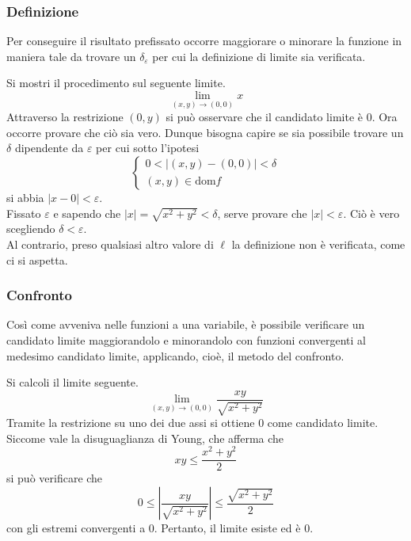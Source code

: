 \subsubsection{Definizione}
Per conseguire il risultato prefissato occorre maggiorare o minorare la funzione in maniera tale da trovare un $\delta_\varepsilon$ per cui la definizione di limite sia verificata.
\begin{example}
    Si mostri il procedimento sul seguente limite.
    \begin{equation*}
        \lim_{(x,y) \to (0,0)}x
    \end{equation*}
    Attraverso la restrizione $(0,y)$ si può osservare che il candidato limite è $0$. Ora occorre provare che ciò sia vero.
    Dunque bisogna capire se sia possibile trovare un $\delta$ dipendente da $\varepsilon$ per cui sotto l'ipotesi
    \begin{equation*}
        \begin{cases}
            0<|(x,y)-(0,0)|<\delta\\
            (x,y) \in \text{dom}f
        \end{cases}
    \end{equation*}
    si abbia $|x-0|<\varepsilon$.\\
    Fissato $\varepsilon$ e sapendo che $|x|=\sqrt{x^2+y^2}<\delta$, serve provare che $|x|<\varepsilon$. Ciò è vero scegliendo $\delta<\varepsilon$.\\
    Al contrario, preso qualsiasi altro valore di $\ell$ la definizione non è verificata, come ci si aspetta.
\end{example}
\subsubsection{Confronto}
Così come avveniva nelle funzioni a una variabile, è possibile verificare un candidato limite maggiorandolo e minorandolo con funzioni convergenti al medesimo candidato limite, applicando, cioè, il metodo del confronto.
\begin{example}
    Si calcoli il limite seguente.
    \begin{equation*}
        \lim_{(x,y) \to (0,0)}{\frac{xy}{\sqrt{x^2+y^2}}}
    \end{equation*}
    Tramite la restrizione su uno dei due assi si ottiene $0$ come candidato limite.
    Siccome vale la disuguaglianza di Young, che afferma che 
    \begin{equation*}
        xy \leq \frac{x^2+y^2}{2}
    \end{equation*}
    si può verificare che
    \begin{equation*}
        0 \leq \left|\frac{xy}{\sqrt{x^2+y^2}}\right| \leq \frac{\sqrt{x^2+y^2}}{2}
    \end{equation*}
    con gli estremi convergenti a $0$. Pertanto, il limite esiste ed è $0$.
\end{example}
